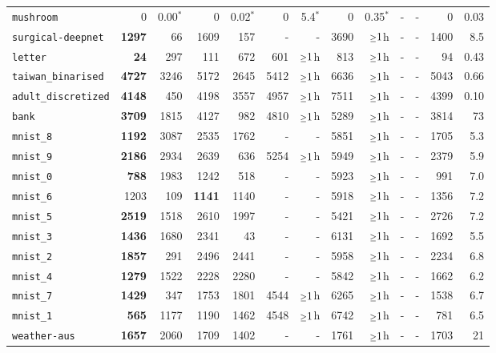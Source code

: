 \begin{tabular}{lrrrrrrrrrrrr}
\texttt{mushroom} & 0 & 0.00$^*$ & 0 & 0.02$^*$ & 0 & 5.4$^*$ & 0 & 0.35$^*$ & - & - & 0 & 0.03\\
\texttt{surgical-deepnet} & \textbf{1297} & 66 & 1609 & 157 & - & - & 3690 & $\mathsmaller{\geq}1$h & - & - & 1400 & 8.5\\
\texttt{letter} & \textbf{24} & 297 & 111 & 672 & 601 & $\mathsmaller{\geq}1$h & 813 & $\mathsmaller{\geq}1$h & - & - & 94 & 0.43\\
\texttt{taiwan\_binarised} & \textbf{4727} & 3246 & 5172 & 2645 & 5412 & $\mathsmaller{\geq}1$h & 6636 & $\mathsmaller{\geq}1$h & - & - & 5043 & 0.66\\
\texttt{adult\_discretized} & \textbf{4148} & 450 & 4198 & 3557 & 4957 & $\mathsmaller{\geq}1$h & 7511 & $\mathsmaller{\geq}1$h & - & - & 4399 & 0.10\\
\texttt{bank} & \textbf{3709} & 1815 & 4127 & 982 & 4810 & $\mathsmaller{\geq}1$h & 5289 & $\mathsmaller{\geq}1$h & - & - & 3814 & 73\\
\texttt{mnist\_8} & \textbf{1192} & 3087 & 2535 & 1762 & - & - & 5851 & $\mathsmaller{\geq}1$h & - & - & 1705 & 5.3\\
\texttt{mnist\_9} & \textbf{2186} & 2934 & 2639 & 636 & 5254 & $\mathsmaller{\geq}1$h & 5949 & $\mathsmaller{\geq}1$h & - & - & 2379 & 5.9\\
\texttt{mnist\_0} & \textbf{788} & 1983 & 1242 & 518 & - & - & 5923 & $\mathsmaller{\geq}1$h & - & - & 991 & 7.0\\
\texttt{mnist\_6} & 1203 & 109 & \textbf{1141} & 1140 & - & - & 5918 & $\mathsmaller{\geq}1$h & - & - & 1356 & 7.2\\
\texttt{mnist\_5} & \textbf{2519} & 1518 & 2610 & 1997 & - & - & 5421 & $\mathsmaller{\geq}1$h & - & - & 2726 & 7.2\\
\texttt{mnist\_3} & \textbf{1436} & 1680 & 2341 & 43 & - & - & 6131 & $\mathsmaller{\geq}1$h & - & - & 1692 & 5.5\\
\texttt{mnist\_2} & \textbf{1857} & 291 & 2496 & 2441 & - & - & 5958 & $\mathsmaller{\geq}1$h & - & - & 2234 & 6.8\\
\texttt{mnist\_4} & \textbf{1279} & 1522 & 2228 & 2280 & - & - & 5842 & $\mathsmaller{\geq}1$h & - & - & 1662 & 6.2\\
\texttt{mnist\_7} & \textbf{1429} & 347 & 1753 & 1801 & 4544 & $\mathsmaller{\geq}1$h & 6265 & $\mathsmaller{\geq}1$h & - & - & 1538 & 6.7\\
\texttt{mnist\_1} & \textbf{565} & 1177 & 1190 & 1462 & 4548 & $\mathsmaller{\geq}1$h & 6742 & $\mathsmaller{\geq}1$h & - & - & 781 & 6.5\\
\texttt{weather-aus} & \textbf{1657} & 2060 & 1709 & 1402 & - & - & 1761 & $\mathsmaller{\geq}1$h & - & - & 1703 & 21\\
\bottomrule
\end{tabular}
